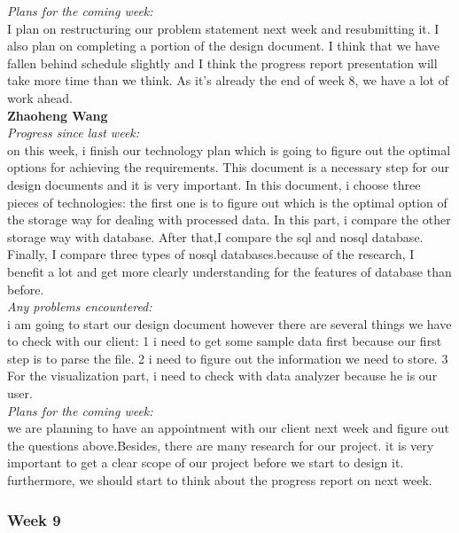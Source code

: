 \noindent\textit{Plans for the coming week:}\\
I plan on restructuring our problem statement next week and resubmitting it. I also plan on completing a portion of the design document. I think that we have fallen behind schedule slightly and I think the progress report presentation will take more time than we think. As it's already the end of week 8, we have a lot of work ahead.\\

\noindent\textbf{Zhaoheng Wang}\\
\noindent\textit{Progress since last week:}\\
 on this week, i finish our technology plan which is going to figure out the optimal options for achieving the requirements. This document is a necessary step for our design documents and it is very important. In this document, i choose three pieces of technologies: the first one is to figure out which is the optimal option of the storage way for dealing with processed data. In this part, i compare the other storage way with database. After that,I compare the sql and nosql database. Finally, I compare three types of nosql databases.because of the research, I benefit a lot and get more clearly understanding for the features of database than before.\\
 
\noindent\textit{Any problems encountered:}\\
 i am going to start our design document however there are several things we have to check with our client: 1 i need to get some sample data first because our first step is to parse the file. 2 i need to figure out the information we need to store. 3 For the visualization part, i need to check with data analyzer because he is our user.\\
 
\noindent\textit{Plans for the coming week:}\\
we are planning to have an appointment with our client next week and figure out the questions above.Besides, there are many research for our project. it is very important to get a clear scope of our project before we start to design it. furthermore, we should start to think about the progress report on next week.
\\\textbf{}

\subsubsection{Week 9}

